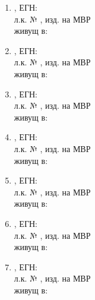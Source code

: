 \documentclass[11pt,a4paper]{article}
\newlength{\itemvspace}
\begin{document}
\begin{enumerate}
\item \makebox[10cm]{\dotfill}, ЕГН: \dotfill \\[\itemvspace]
  л.к. № \makebox[5cm]{\dotfill}, изд. на \makebox[4cm]{\dotfill} МВР \dotfill \\[\itemvspace]
  живущ в: \dotfill \\[\itemvspace]
\item \makebox[10cm]{\dotfill}, ЕГН: \dotfill \\[\itemvspace]
  л.к. № \makebox[5cm]{\dotfill}, изд. на \makebox[4cm]{\dotfill} МВР \dotfill \\[\itemvspace]
  живущ в: \dotfill \\[\itemvspace]
\item \makebox[10cm]{\dotfill}, ЕГН: \dotfill \\[\itemvspace]
  л.к. № \makebox[5cm]{\dotfill}, изд. на \makebox[4cm]{\dotfill} МВР \dotfill \\[\itemvspace]
  живущ в: \dotfill \\[\itemvspace]
\item \makebox[10cm]{\dotfill}, ЕГН: \dotfill \\[\itemvspace]
  л.к. № \makebox[5cm]{\dotfill}, изд. на \makebox[4cm]{\dotfill} МВР \dotfill \\[\itemvspace]
  живущ в: \dotfill \\[\itemvspace]
\item \makebox[10cm]{\dotfill}, ЕГН: \dotfill \\[\itemvspace]
  л.к. № \makebox[5cm]{\dotfill}, изд. на \makebox[4cm]{\dotfill} МВР \dotfill \\[\itemvspace]
  живущ в: \dotfill \\[\itemvspace]
\item \makebox[10cm]{\dotfill}, ЕГН: \dotfill \\[\itemvspace]
  л.к. № \makebox[5cm]{\dotfill}, изд. на \makebox[4cm]{\dotfill} МВР \dotfill \\[\itemvspace]
  живущ в: \dotfill \\[\itemvspace]
\item \makebox[10cm]{\dotfill}, ЕГН: \dotfill \\[\itemvspace]
  л.к. № \makebox[5cm]{\dotfill}, изд. на \makebox[4cm]{\dotfill} МВР \dotfill \\[\itemvspace]
  живущ в: \dotfill \\[\itemvspace]
\end{enumerate}
\end{document}
